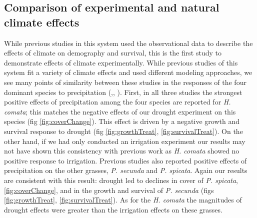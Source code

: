 \documentclass[11pt]{article}
\begin{document}
\begin{doublespacing}
\subsection*{Comparison of experimental and natural climate effects}
While previous studies in this system used the observational data to describe the effects of climate on demography and survival, this is the first study to demonstrate effects of climate experimentally. While previous studies of this system fit a variety of climate effects and used different modeling approaches, we see many points of similarity between these studies in the responses of the four dominant species to precipitation (\citep{chu_direct_2016},\citep{dalgleish_climate_2010}, \citep{adler_forecasting_2012}). First, in all three studies the strongest positive effects of precipitation among the four species are reported for \textit{H. comata}; this matches the negative effects of our drought experiment on this species (fig \ref{fig:coverChange}). This effect is driven by a negative growth and survival response to drought (fig \ref{fig:growthTreat}, \ref{fig:survivalTreat}). On the other hand, if we had only conducted an irrigation experiment our results may not have shown this consistency with previous work as \textit{H. comata} showed no positive response to irrigation. Previous studies also reported positive effects of precipitation on the other grasses, \textit{P. secunda} and \textit{P. spicata}. Again our results are consistent with this result: drought led to declines in cover of \textit{P. spicata}, \ref{fig:coverChange}, and in the growth and survival of \textit{P. secunda} (figs \ref{fig:growthTreat}, \ref{fig:survivalTreat}). As for the \textit{H. comata} the magnitudes of drought effects were greater than the irrigation effects on these grasses. 


\end{doublespacing}
\end{document}
